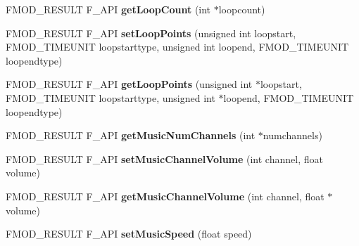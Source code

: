 \begin{DoxyCompactItemize}
\item 
\hypertarget{class_f_m_o_d_1_1_sound_a8ed3b79d45f937d215a84e52c2be4891}{F\+M\+O\+D\+\_\+\+R\+E\+S\+U\+L\+T F\+\_\+\+A\+P\+I {\bfseries get\+Loop\+Count} (int $\ast$loopcount)}\label{class_f_m_o_d_1_1_sound_a8ed3b79d45f937d215a84e52c2be4891}

\item 
\hypertarget{class_f_m_o_d_1_1_sound_ae4ed822496a4bd387e8384aec67e33f9}{F\+M\+O\+D\+\_\+\+R\+E\+S\+U\+L\+T F\+\_\+\+A\+P\+I {\bfseries set\+Loop\+Points} (unsigned int loopstart, F\+M\+O\+D\+\_\+\+T\+I\+M\+E\+U\+N\+I\+T loopstarttype, unsigned int loopend, F\+M\+O\+D\+\_\+\+T\+I\+M\+E\+U\+N\+I\+T loopendtype)}\label{class_f_m_o_d_1_1_sound_ae4ed822496a4bd387e8384aec67e33f9}

\item 
\hypertarget{class_f_m_o_d_1_1_sound_a6528c2344a8f4b87c1f48bc02a829fc5}{F\+M\+O\+D\+\_\+\+R\+E\+S\+U\+L\+T F\+\_\+\+A\+P\+I {\bfseries get\+Loop\+Points} (unsigned int $\ast$loopstart, F\+M\+O\+D\+\_\+\+T\+I\+M\+E\+U\+N\+I\+T loopstarttype, unsigned int $\ast$loopend, F\+M\+O\+D\+\_\+\+T\+I\+M\+E\+U\+N\+I\+T loopendtype)}\label{class_f_m_o_d_1_1_sound_a6528c2344a8f4b87c1f48bc02a829fc5}

\item 
\hypertarget{class_f_m_o_d_1_1_sound_ae5af50e5bdaec640dceb9a797c75fa99}{F\+M\+O\+D\+\_\+\+R\+E\+S\+U\+L\+T F\+\_\+\+A\+P\+I {\bfseries get\+Music\+Num\+Channels} (int $\ast$numchannels)}\label{class_f_m_o_d_1_1_sound_ae5af50e5bdaec640dceb9a797c75fa99}

\item 
\hypertarget{class_f_m_o_d_1_1_sound_ab5dc7c5f81b8301d9ea74bd0c0d00c49}{F\+M\+O\+D\+\_\+\+R\+E\+S\+U\+L\+T F\+\_\+\+A\+P\+I {\bfseries set\+Music\+Channel\+Volume} (int channel, float volume)}\label{class_f_m_o_d_1_1_sound_ab5dc7c5f81b8301d9ea74bd0c0d00c49}

\item 
\hypertarget{class_f_m_o_d_1_1_sound_afc1ef61ba84190294a6b1f1f0fd3ab64}{F\+M\+O\+D\+\_\+\+R\+E\+S\+U\+L\+T F\+\_\+\+A\+P\+I {\bfseries get\+Music\+Channel\+Volume} (int channel, float $\ast$volume)}\label{class_f_m_o_d_1_1_sound_afc1ef61ba84190294a6b1f1f0fd3ab64}

\item 
\hypertarget{class_f_m_o_d_1_1_sound_af5fe3deac71212ab13531a7bec20c918}{F\+M\+O\+D\+\_\+\+R\+E\+S\+U\+L\+T F\+\_\+\+A\+P\+I {\bfseries set\+Music\+Speed} (float speed)}\label{class_f_m_o_d_1_1_sound_af5fe3deac71212ab13531a7bec20c918}


\end{DoxyCompactItemize}
